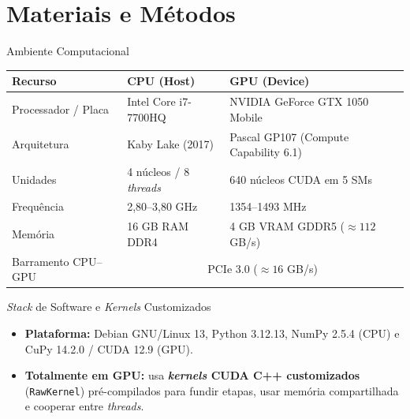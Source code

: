 
\section{Materiais e Métodos}

\begin{frame}{Ambiente Computacional}
  \begin{slidetabela}
    \begin{tabular}{@{}lll@{}}
      \toprule
      \textbf{Recurso} & \textbf{CPU (Host)} & \textbf{GPU (Device)} \\
      \midrule
      Processador / Placa & Intel Core i7-7700HQ        & NVIDIA GeForce GTX 1050 Mobile \\
      Arquitetura         & Kaby Lake (2017)            & Pascal GP107 (Compute Capability 6.1) \\
      Unidades            & 4 núcleos / 8 \emph{threads} & 640 núcleos CUDA em 5 SMs \\
      Frequência          & 2,80--3,80 GHz              & 1354--1493 MHz \\
      Memória             & 16 GB RAM DDR4              & 4 GB VRAM GDDR5 ($\approx 112$ GB/s) \\
      Barramento CPU--GPU & \multicolumn{2}{c}{PCIe 3.0 ($\approx 16$ GB/s)} \\
      \bottomrule
    \end{tabular}
  \end{slidetabela}

  \vspace{0.18cm}
  \begin{block}{\emph{Stack} de Software e \emph{Kernels} Customizados}
    \begin{itemize}
      \item \textbf{Plataforma:} Debian GNU/Linux 13, Python 3.12.13, NumPy 2.5.4 (CPU) e CuPy 14.2.0 / CUDA 12.9 (GPU).
      \item \textbf{Totalmente em GPU:} usa \textbf{\emph{kernels} CUDA C++ customizados} (\texttt{RawKernel}) pré-compilados para fundir etapas, usar memória compartilhada e cooperar entre \emph{threads}.
    \end{itemize}
  \end{block}
\end{frame}

